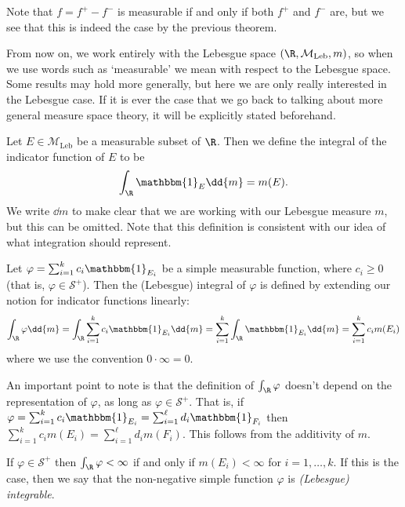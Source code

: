 \documentclass{maths}
\newcommand{\mleb}{\mathcal{M}_{\text{Leb}}}
\newcommand{\smpl}{\mathcal{S}}
\newcommand{\ind}{\mathbbm{1}}
\begin{document}
\begin{prf}
    Note that $f=f^+-f^-$ is measurable if and only if both $f^+$ and $f^-$ are, but we see that this is indeed the case by the previous theorem.
\end{prf}

\begin{rem}
    From now on, we work entirely with the Lebesgue space $(\R,\mleb,m)$, so when we use words such as `measurable' we mean with respect to the Lebesgue space.
    Some results may hold more generally, but here we are only really interested in the Lebesgue case.
    If it is ever the case that we go back to talking about more general measure space theory, it will be explicitly stated beforehand.
\end{rem}

\begin{defn}
    Let $E\in\mleb$ be a measurable subset of $\R$.
    Then we define the integral of the indicator function of $E$ to be
    \[
        \int_{\R} \ind_E \dd{m} =
        m(E).
    \]
    We write $\dd{m}$ to make clear that we are working with our Lebesgue measure $m$, but this can be omitted.
    Note that this definition is consistent with our idea of what integration should represent.
\end{defn}

\begin{defn}
    Let $\varphi=\sum_{i=1}^k c_i \ind_{E_i}$ be a simple measurable function, where $c_i\geqslant0$ (that is, $\varphi\in\smpl^+$).
    Then the (Lebesgue) integral of $\varphi$ is defined by extending our notion for indicator functions linearly:
    \[
        \int_{\R} \varphi \dd{m} =
        \int_{\R} \sum_{i=1}^k c_i \ind_{E_i} \dd{m} =
        \sum_{i=1}^k \int_{\R} \ind_{E_i} \dd{m} =
        \sum_{i=1}^k c_i m(E_i)
    \]
    where we use the convention $0\cdot\infty=0$.

    An important point to note is that the definition of $\int_{\R}\varphi$ doesn't depend on the representation of $\varphi$, as long as $\varphi\in\smpl^+$.
    That is, if $\varphi=\sum_{i=1}^k c_i \ind_{E_i}=\sum_{i=1}^{\ell} d_i \ind_{F_i}$ then $\sum_{i=1}^k c_i m(E_i)=\sum_{i=1}^{\ell} d_i m(F_i)$.
    This follows from the additivity of $m$.

    If $\varphi\in\smpl^+$ then $\int_{\R}\varphi<\infty$ if and only if $m(E_i)<\infty$ for $i=1,\ldots,k$.
    If this is the case, then we say that the non-negative simple function $\varphi$ is \emph{(Lebesgue) integrable}.
\end{defn}
\end{document}
